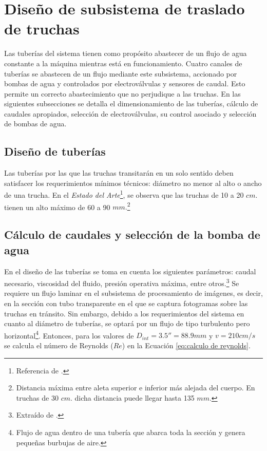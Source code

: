 
\section{Diseño de subsistema de traslado de truchas}

Las tuberías del sistema tienen como propósito abastecer de un flujo de agua constante a la máquina mientras está en funcionamiento. Cuatro canales de tuberías se abastecen de un flujo mediante este subsistema, accionado por bombas de agua y controlados por electroválvulas y sensores de caudal. Esto permite un correcto abastecimiento que no perjudique a las truchas. En las siguientes subsecciones se detalla el dimensionamiento de las tuberías, cálculo de caudales apropiados, selección de electroválvulas, su control asociado y selección de bombas de agua.

\subsection{Diseño de tuberías}
	
Las tuberías por las que las truchas transitarán en un solo sentido deben satisfacer los requerimientos mínimos técnicos: diámetro no menor al alto o ancho de una trucha. En el \textit{Estado del Arte}\footnote{Referencia de \cite{DiazVergara2020}.}, se observa que las truchas de 10 a 20 $cm.$ tienen un alto máximo de 60 a 90 $mm.$\footnote{Distancia máxima entre aleta superior e inferior más alejada del cuerpo. En truchas de 30 $cm.$ dicha distancia puede llegar hasta 135 $mm.$}

\subsection{Cálculo de caudales y selección de la bomba de agua}
	
En el diseño de las tuberías se toma en cuenta los siguientes parámetros: caudal necesario, viscosidad del fluido, presión operativa máxima, entre otros.\footnote{Extraído de \cite{INTECHGmbH2020}.} Se requiere un flujo laminar en el subsistema de procesamiento de imágenes, es decir, en la sección con tubo transparente en el que se captura fotogramas sobre las truchas en tránsito. Sin embargo, debido a los requerimientos del sistema en cuanto al diámetro de tuberías, se optará por un flujo de tipo turbulento pero horizontal\footnote{Flujo de agua dentro de una tubería que abarca toda la sección y genera pequeñas burbujas de aire.}. Entonces, para los valores de $D_{int}=3.5''=88.9 mm$ y $v=210 cm/s$ se calcula el número de Reynolds ($Re$) en la Ecuación \ref{eq:calculo de reynolds}.
	
